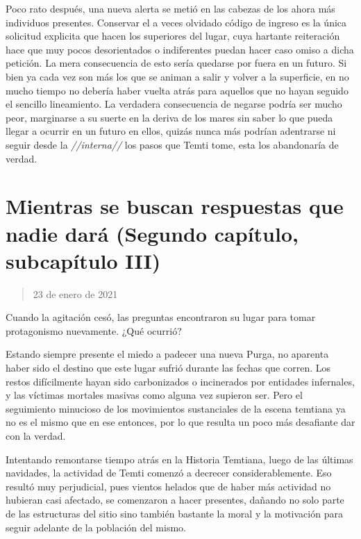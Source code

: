 \documentclass[
  spanish,
]{book}
\begin{document}
Poco rato después, una nueva alerta se metió en las cabezas de los ahora más individuos presentes. Conservar el a veces olvidado código de ingreso es la única solicitud explicita que hacen los superiores del lugar, cuya hartante reiteración hace que muy pocos desorientados o indiferentes puedan hacer caso omiso a dicha petición. La mera consecuencia de esto sería quedarse por fuera en un futuro. Si bien ya cada vez son más los que se animan a salir y volver a la superficie, en no mucho tiempo no debería haber vuelta atrás para aquellos que no hayan seguido el sencillo lineamiento. La verdadera consecuencia de negarse podría ser mucho peor, marginarse a su suerte en la deriva de los mares sin saber lo que pueda llegar a ocurrir en un futuro en ellos, quizás nunca más podrían adentrarse ni seguir desde la \emph{//interna//} los pasos que Temti tome, esta los abandonaría de verdad.

\hypertarget{mientras-se-buscan-respuestas-que-nadie-daruxe1-segundo-capuxedtulo-subcapuxedtulo-iii}{%
\section{Mientras se buscan respuestas que nadie dará (Segundo capítulo, subcapítulo III)}\label{mientras-se-buscan-respuestas-que-nadie-daruxe1-segundo-capuxedtulo-subcapuxedtulo-iii}}

\begin{quote}
23 de enero de 2021
\end{quote}

Cuando la agitación cesó, las preguntas encontraron su lugar para tomar protagonismo nuevamente. ¿Qué ocurrió?

Estando siempre presente el miedo a padecer una nueva Purga, no aparenta haber sido el destino que este lugar sufrió durante las fechas que corren. Los restos difícilmente hayan sido carbonizados o incinerados por entidades infernales, y las víctimas mortales masivas como alguna vez supieron ser. Pero el seguimiento minucioso de los movimientos sustanciales de la escena temtiana ya no es el mismo que en ese entonces, por lo que resulta un poco más desafiante dar con la verdad.

Intentando remontarse tiempo atrás en la Historia Temtiana, luego de las últimas navidades, la actividad de Temti comenzó a decrecer considerablemente. Eso resultó muy perjudicial, pues vientos helados que de haber más actividad no hubieran casi afectado, se comenzaron a hacer presentes, dañando no solo parte de las estructuras del sitio sino también bastante la moral y la motivación para seguir adelante de la población del mismo.
\end{document}
